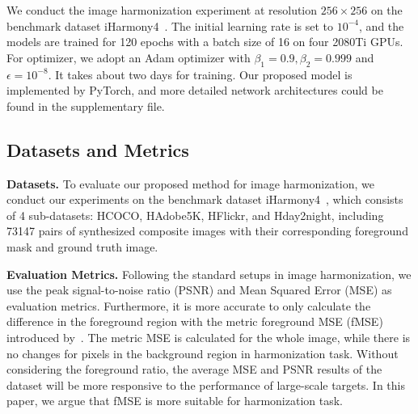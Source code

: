 \documentclass[10pt,twocolumn,letterpaper]{article}
\begin{document}
We conduct the image harmonization experiment at resolution $256 \times 256$ on the benchmark dataset iHarmony4~\cite{Cong_2020_CVPR}. The initial learning rate is set to $10^{-4}$, and the models are trained for 120 epochs with a batch size of 16 on four 2080Ti GPUs. For optimizer, we adopt an Adam optimizer with $\beta_{1}=0.9,\beta_{2}=0.999$ and $\epsilon=10^{-8}$. It takes about two days for training. Our proposed model is implemented by PyTorch, and more detailed network architectures could be found in the supplementary file.

\subsection{Datasets and Metrics}

\noindent \textbf{Datasets.}
To evaluate our proposed method for image harmonization, we conduct our experiments on the benchmark dataset iHarmony4~\cite{Cong_2020_CVPR}, which consists of 4 sub-datasets: HCOCO, HAdobe5K, HFlickr, and Hday2night, including 73147 pairs of synthesized composite images with their corresponding foreground mask and ground truth image. 

\noindent \textbf{Evaluation Metrics.}
Following the standard setups in image harmonization, we use the peak signal-to-noise ratio (PSNR) and Mean Squared Error (MSE) as evaluation metrics. Furthermore, it is more accurate to only calculate the difference in the foreground region with the metric foreground MSE (fMSE) introduced by~\cite{Sofiiuk_2021_WACV}. The metric MSE is calculated for the whole image, while there is no changes for pixels in the background region in harmonization task. Without considering the foreground ratio, the average MSE and PSNR results of the dataset will be more responsive to the performance of large-scale targets. In this paper, we argue that fMSE is more suitable for harmonization task.
\end{document}
